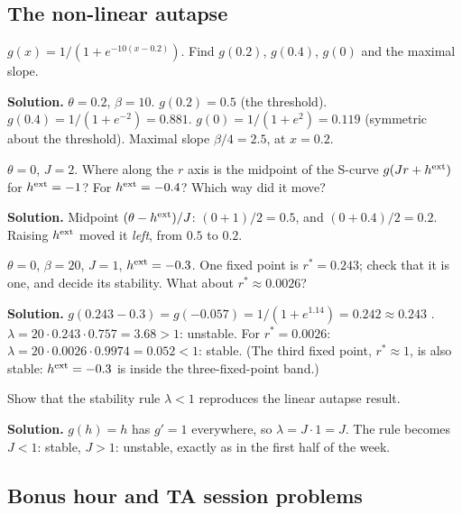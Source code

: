 \subsection*{The non-linear autapse}

\begin{example}
$g(x) = 1/(1+e^{-10(x-0.2)})$. Find $g(0.2)$, $g(0.4)$, $g(0)$ and the maximal slope.

\textbf{Solution.} $\theta=0.2$, $\beta=10$. $g(0.2)=0.5$ (the threshold). $g(0.4) = 1/(1+e^{-2}) = 0.881$. $g(0) = 1/(1+e^{2}) = 0.119$ (symmetric about the threshold). Maximal slope $\beta/4 = 2.5$, at $x=0.2$.
\end{example}

\begin{example}
$\theta=0$, $J=2$. Where along the $r$ axis is the midpoint of the S-curve $g(Jr+h^{\text{ext}})$ for $h^{\text{ext}}=-1$? For $h^{\text{ext}}=-0.4$? Which way did it move?

\textbf{Solution.} Midpoint $(\theta-h^{\text{ext}})/J$: $(0+1)/2 = 0.5$, and $(0+0.4)/2 = 0.2$. Raising $h^{\text{ext}}$ moved it \emph{left}, from $0.5$ to $0.2$.
\end{example}

\begin{example}
$\theta=0$, $\beta=20$, $J=1$, $h^{\text{ext}}=-0.3$. One fixed point is $r^*=0.243$; check that it is one, and decide its stability. What about $r^*\approx0.0026$?

\textbf{Solution.} $g(0.243-0.3) = g(-0.057) = 1/(1+e^{1.14}) = 0.242\approx0.243$ \checkmark. $\lambda = 20\cdot0.243\cdot0.757 = 3.68>1$: unstable.
For $r^*=0.0026$: $\lambda = 20\cdot0.0026\cdot0.9974 = 0.052<1$: stable. (The third fixed point, $r^*\approx1$, is also stable: $h^{\text{ext}}=-0.3$ is inside the three-fixed-point band.)
\end{example}

\begin{example}
Show that the stability rule $\lambda<1$ reproduces the linear autapse result.

\textbf{Solution.} $g(h)=h$ has $g'=1$ everywhere, so $\lambda = J\cdot1 = J$. The rule becomes $J<1$: stable, $J>1$: unstable, exactly as in the first half of the week.
\end{example}


\subsection*{Bonus hour and TA session problems}

